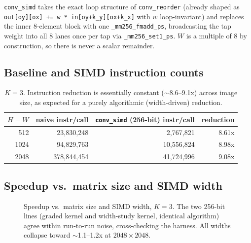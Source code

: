 \documentclass[11pt]{article}
\begin{document}
\texttt{conv\_simd} takes the exact loop structure of \texttt{conv\_reorder} (already
shaped as \texttt{out[oy][ox] += w * in[oy+k\_y][ox+k\_x]} with $w$ loop-invariant) and
replaces the inner 8-element block with one \texttt{\_mm256\_fmadd\_ps}, broadcasting the
tap weight into all 8 lanes once per tap via \texttt{\_mm256\_set1\_ps}. $W$ is a
multiple of 8 by construction, so there is never a scalar remainder.

\subsection*{Baseline and SIMD instruction counts}
\begin{table}[h]
\centering
\begin{tabular}{r r r r}
\toprule
$H{=}W$ & naive instr/call & \texttt{conv\_simd} (256-bit) instr/call & reduction \\
\midrule
512  & 23{,}830{,}248  & 2{,}767{,}821  & 8.61x \\
1024 & 94{,}829{,}763  & 10{,}556{,}824 & 8.98x \\
2048 & 378{,}844{,}454 & 41{,}724{,}996 & 9.08x \\
\bottomrule
\end{tabular}
\caption{$K{=}3$. Instruction reduction is essentially constant ($\sim$8.6--9.1x)
across image size, as expected for a purely algorithmic (width-driven) reduction.}
\end{table}

\subsection*{Speedup vs.\ matrix size and SIMD width}
\begin{figure}[h]
\centering
{}
\caption{Speedup vs.\ matrix size and SIMD width, $K{=}3$. The two 256-bit lines
(graded kernel and width-study kernel, identical algorithm) agree within run-to-run
noise, cross-checking the harness. All widths collapse toward $\sim$1.1--1.2x at
$2048{\times}2048$.}
\end{figure}
\end{document}
